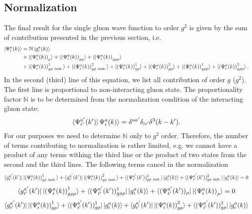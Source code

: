 \documentclass[aps,prd,amsmath,amssymb,nofootinbib]{revtex4-2}
\def\mf#1{\mathbb{#1}}
\numberwithin{equation}{section}
\begin{document}
\subsection{Normalization}
The final result for the single gluon wave function to order $g^2$ is given by the sum of contribution presented in the previous section, i.e. 
\begin{align}
  \ket{\Psi^{a}_{i}(k)}%
 & = \mf{N} \ket{ g_i^a(k) }%
 \\ \notag & + 
 \ket{ \left(\Psi^{a}_{i}(k) \right)_{\rho} }%
+\ket{ \left(\Psi^{a}_{i}(k) \right)_{gg} }%
+\ket{ \left(\Psi^{a}_{i}(k) \right)_{gg\rho} }%
\\ & +\ket{ \left(\Psi^{a}_{i}(k) \right)^{1}_{g \rho\ {\rm inst.} } }%
+\ket{ \left(\Psi^{a}_{i}(k) \right)^{2}_{g \rho\ {\rm inst.} } }%
+\ket{ \left(\Psi^{a}_{i}(k) \right)^{1}_{g \rho} }%
+\ket{ \left(\Psi^{a}_{i}(k) \right)^{2}_{g \rho} }%
+\ket{ \left(\Psi^{a}_{i}(k) \right)^{1}_{g\rho\rho} }%
+\ket{ \left(\Psi^{a}_{i}(k) \right)^{2}_{g\rho\rho} }. %
\label{Eq:intergluon}
\end{align}
In the second (third) line of this equation, we list all contribution of order $g$ ($g^2$). 
The first line is proportional to non-interacting gluon state. The proportionality factor  $\mf{N}$  is to be determined from the normalization 
condition of the interacting gluon state: 
\begin{align}
  \bra{\Psi^{a'}_{i'}(k')}%
  {\Psi^{a}_{i}(k)} \rangle%
  = \delta^{a a'} \delta_{i i'} \delta^{3}(k-k'). 
\end{align}
For our purposes we need to determine  $\mf{N}$ only to $g^2$ order. Therefore, the number of terms contributing to normalization is rather limited, 
e.g. we cannot have a product of any terms withing the third line or the product of two states from the second and the third lines. The following terms cancel in the normalization 
 $$  \bra{g^{a'}_{i'}(k')}\ket{ \left(\Psi^{a}_{i}(k) \right)^{1}_{g \rho\ {\rm inst.} } } + \bra{g^{a'}_{i'}(k')}\ket{ \left(\Psi^{a}_{i}(k) \right)^{2}_{g \rho\ {\rm inst.} } }+\bra{(\Psi^{a'}_{i'}(k'))^{1}_{g \rho\ {\rm inst.} } }\ket{g^{a}_{i}(k)} +\bra{(\Psi^{a'}_{i'}(k'))^{2}_{g \rho\ {\rm inst.} } }\ket{g^{a}_{i}(k)}  = 0 $$
 $$\bra{g^{a'}_{i'}(k')}\ket{ \left(\Psi^{a}_{i}(k) \right)^{1}_{g\rho\rho} }+ \bra{(\Psi^{a'}_{i'}(k'))^{1}_{g\rho\rho} }\ket{g^{a}_{i}(k)} + \bra{(\Psi^{a'}_{i'}(k'))_{\rho} }\ket{ \left(\Psi^{a}_{i}(k) \right)_{\rho} } = 0$$
 $$\bra{g^{a'}_{i'}(k')}\ket{ \left(\Psi^{a}_{i}(k) \right)^{1}_{g \rho} }+\bra{(\Psi^{a'}_{i'}(k'))^{1}_{g \rho} }\ket{g^{a}_{i}(k)} +\bra{g^{a'}_{i'}(k')}\ket{ \left(\Psi^{a}_{i}(k) \right)^{2}_{g \rho} }+\bra{(\Psi^{a'}_{i'}(k'))^{2}_{g \rho} }\ket{g^{a}_{i}(k)}$$
\end{document}

